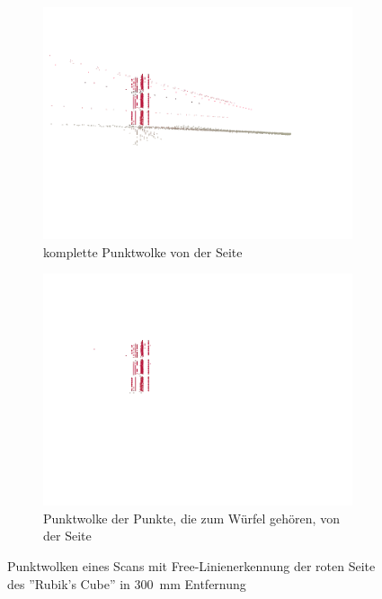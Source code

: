 \documentclass[ngerman,a4paper,parskip=half]{scrartcl}
\begin{document}
\begin{figure}[H]
\begin{subfigure}{0.45\textwidth}
		\includegraphics[width=\textwidth]{includes/free_red_pos1.png}
		\caption{komplette Punktwolke von der Seite}
	\end{subfigure}
	\hfill
	\begin{subfigure}{0.45\textwidth}
		\includegraphics[width=\textwidth]{includes/free_only_red_pos1.png}
		\caption{Punktwolke der Punkte, die zum Würfel gehören, von der Seite}
	\end{subfigure}
	\caption{Punktwolken eines Scans mit Free-Linienerkennung der roten Seite des ''Rubik's Cube'' in 300~mm Entfernung}
\end{figure}
\end{document}
